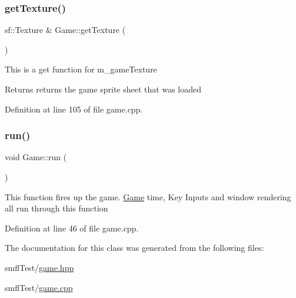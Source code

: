 \subsubsection{\texorpdfstring{get\+Texture()}{getTexture()}}
{\footnotesize\ttfamily sf\+::\+Texture \& Game\+::get\+Texture (\begin{DoxyParamCaption}{ }\end{DoxyParamCaption})}

This is a get function for m\+\_\+game\+Texture

\begin{DoxyReturn}{Returns}
returns the game sprite sheet that was loaded 
\end{DoxyReturn}


Definition at line 105 of file game.\+cpp.

\mbox{\label{class_game_a1ab78f5ed0d5ea879157357cf2fb2afa}} 
\subsubsection{\texorpdfstring{run()}{run()}}
{\footnotesize\ttfamily void Game\+::run (\begin{DoxyParamCaption}{ }\end{DoxyParamCaption})}

This function fires up the game. \hyperlink{class_game}{Game} time, Key Inputs and window rendering all run through this function 

Definition at line 46 of file game.\+cpp.



The documentation for this class was generated from the following files\+:\begin{DoxyCompactItemize}
\item 
smfl\+Test/\hyperlink{game_8hpp}{game.\+hpp}\item 
smfl\+Test/\hyperlink{game_8cpp}{game.\+cpp}\end{DoxyCompactItemize}
